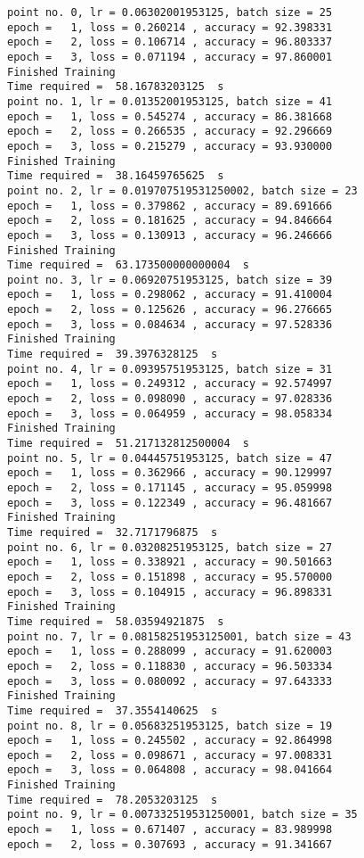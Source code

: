 \documentclass[11pt]{article}
\begin{document}
    \begin{Verbatim}[commandchars=\\\{\}]
point no. 0, lr = 0.06302001953125, batch size = 25
epoch =   1, loss = 0.260214 , accuracy = 92.398331
epoch =   2, loss = 0.106714 , accuracy = 96.803337
epoch =   3, loss = 0.071194 , accuracy = 97.860001
Finished Training
Time required =  58.16783203125  s 
point no. 1, lr = 0.01352001953125, batch size = 41
epoch =   1, loss = 0.545274 , accuracy = 86.381668
epoch =   2, loss = 0.266535 , accuracy = 92.296669
epoch =   3, loss = 0.215279 , accuracy = 93.930000
Finished Training
Time required =  38.16459765625  s 
point no. 2, lr = 0.019707519531250002, batch size = 23
epoch =   1, loss = 0.379862 , accuracy = 89.691666
epoch =   2, loss = 0.181625 , accuracy = 94.846664
epoch =   3, loss = 0.130913 , accuracy = 96.246666
Finished Training
Time required =  63.173500000000004  s 
point no. 3, lr = 0.06920751953125, batch size = 39
epoch =   1, loss = 0.298062 , accuracy = 91.410004
epoch =   2, loss = 0.125626 , accuracy = 96.276665
epoch =   3, loss = 0.084634 , accuracy = 97.528336
Finished Training
Time required =  39.3976328125  s 
point no. 4, lr = 0.09395751953125, batch size = 31
epoch =   1, loss = 0.249312 , accuracy = 92.574997
epoch =   2, loss = 0.098090 , accuracy = 97.028336
epoch =   3, loss = 0.064959 , accuracy = 98.058334
Finished Training
Time required =  51.217132812500004  s 
point no. 5, lr = 0.04445751953125, batch size = 47
epoch =   1, loss = 0.362966 , accuracy = 90.129997
epoch =   2, loss = 0.171145 , accuracy = 95.059998
epoch =   3, loss = 0.122349 , accuracy = 96.481667
Finished Training
Time required =  32.7171796875  s 
point no. 6, lr = 0.03208251953125, batch size = 27
epoch =   1, loss = 0.338921 , accuracy = 90.501663
epoch =   2, loss = 0.151898 , accuracy = 95.570000
epoch =   3, loss = 0.104915 , accuracy = 96.898331
Finished Training
Time required =  58.03594921875  s 
point no. 7, lr = 0.08158251953125001, batch size = 43
epoch =   1, loss = 0.288099 , accuracy = 91.620003
epoch =   2, loss = 0.118830 , accuracy = 96.503334
epoch =   3, loss = 0.080092 , accuracy = 97.643333
Finished Training
Time required =  37.3554140625  s 
point no. 8, lr = 0.05683251953125, batch size = 19
epoch =   1, loss = 0.245502 , accuracy = 92.864998
epoch =   2, loss = 0.098671 , accuracy = 97.008331
epoch =   3, loss = 0.064808 , accuracy = 98.041664
Finished Training
Time required =  78.2053203125  s 
point no. 9, lr = 0.007332519531250001, batch size = 35
epoch =   1, loss = 0.671407 , accuracy = 83.989998
epoch =   2, loss = 0.307693 , accuracy = 91.341667

\end{Verbatim}
\end{document}
